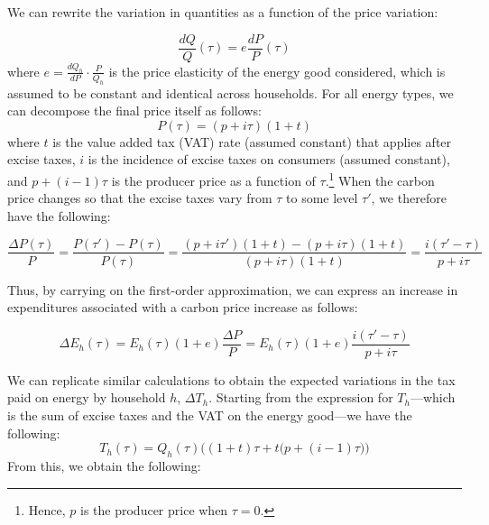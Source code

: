 \documentclass[12pt]{article} %
\begin{document}
\begin{appendices}
\noindent
We can rewrite the variation in quantities as a function of the price variation:

$$
\frac{dQ}{Q} \left(\tau \right) = e\frac{dP}{P}\left(\tau\right)
$$
\noindent
where $e = \frac{dQ_h}{dP} \cdot \frac{P}{Q_h}$ is the price elasticity of the energy good considered, which is assumed to be constant and identical across households. For all energy types, we can decompose the final price itself as follows:
$$
P\left(\tau\right) = \left(p+i\tau\right)\left(1+t\right)
$$
\noindent
where $t$ is the value added tax (VAT) rate (assumed constant) that applies after excise taxes, $i$ is the incidence of excise taxes on consumers (assumed constant), and $p + \left(i-1\right)\tau$ is the producer price as a function of $\tau$.\footnote{Hence, $p$ is the producer price when $\tau = 0$.} When the carbon price changes so that the excise taxes vary from $\tau$ to some level $\tau'$, we therefore have the following: %

$$
\frac{\Delta P\left(\tau\right)}{P}
= \frac{P\left(\tau '\right) - P\left(\tau\right)}{P\left(\tau\right)}
= \frac{\left(p + i \tau '\right)\left(1+t\right) -  \left(p + i \tau\right)\left(1+t\right)}{\left(p + i \tau\right)\left(1+t\right)}
= \frac{i\left(\tau' - \tau\right)}{p + i \tau}
$$

\noindent


Thus, by carrying on the first-order approximation, we can express an increase in expenditures associated with a carbon price increase as follows:

\begin{equation}
\label{eq:formula_expenditures}
    \Delta E_h\left(\tau\right) = E_h\left(\tau\right)\left(1+e\right) \frac{\Delta P}{P} = E_h\left(\tau\right)\left(1+e\right) \frac{i\left(\tau' - \tau\right)}{p + i \tau}
\end{equation}

\noindent
We can replicate similar calculations to obtain the expected variations in the tax paid on energy by household $h$, $\Delta T_h$. Starting from the expression for $T_h$---which is the sum of excise taxes and the VAT on the energy good---we have the following:
$$
T_h\left(\tau\right)
= Q_h\left(\tau\right) \bigg(\left(1+t\right) \tau + t \big(p + \left(i-1\right)\tau \big) \bigg)
$$
\noindent
From this, we obtain the following:


\end{appendices}
\end{document}
